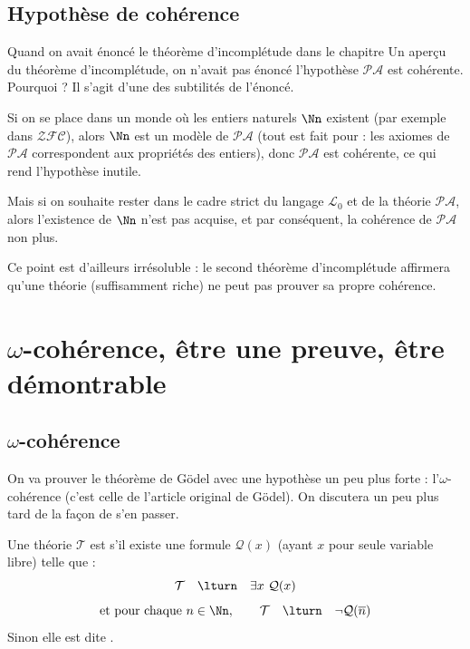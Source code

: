 \documentclass[11pt,class=report,crop=false]{standalone}
\begin{document}
\subsection{Hypothèse de cohérence}

Quand on avait énoncé le théorème d'incomplétude dans le chapitre \og{}Un aperçu du théorème d'incomplétude\fg{}, on n'avait pas énoncé l'hypothèse \og{}$\mathcal{PA}$ est cohérente\fg{}. Pourquoi ? Il s'agit d'une des subtilités de l'énoncé.

Si on se place dans un monde où les entiers naturels $\Nn$ existent (par exemple dans $\mathcal{ZFC}$), alors $\Nn$ est un modèle de $\mathcal{PA}$ (tout est fait pour : les axiomes de $\mathcal{PA}$ correspondent aux propriétés des entiers), donc $\mathcal{PA}$ est cohérente, ce qui rend l'hypothèse inutile.

Mais si on souhaite rester dans le cadre strict du langage $\mathcal{L}_0$ et de la théorie $\mathcal{PA}$, alors l'existence de $\Nn$ n'est pas acquise, et par conséquent, la cohérence de $\mathcal{PA}$ non plus.

Ce point est d'ailleurs irrésoluble : le second théorème d'incomplétude affirmera qu'une théorie  (suffisamment riche) ne peut pas prouver sa propre cohérence.



\section{$\omega$-cohérence, être une preuve, être démontrable}

\subsection{$\omega$-cohérence}

On va prouver le théorème de Gödel avec une hypothèse un peu plus forte : l'$\omega$-cohérence (c'est celle de l'article original de Gödel). On discutera un peu plus tard de la façon de s'en passer.

\begin{definition}
    Une théorie $\mathcal{T}$ est  s'il existe une formule $\mathcal{Q}(x)$ (ayant $x$ pour seule variable libre) telle que :
    \[
    \mathcal{T}\quad \lturn \quad \exists x \ \mathcal{Q}(x) 
    \]
    \[
    \text{et pour chaque } n \in \Nn, \qquad \mathcal{T} \quad \lturn \quad \lnot\mathcal{Q}(\overline{n})
    \]
    Sinon elle est dite .
\end{definition}
\end{document}
